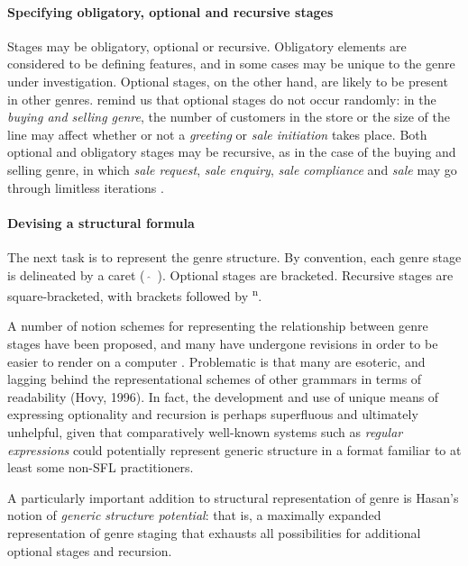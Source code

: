 \paragraph{Specifying obligatory, optional and recursive stages}

Stages may be obligatory, optional or recursive. Obligatory elements are considered to be defining features, and in some cases may be unique to the genre under investigation. Optional stages, on the other hand, are likely to be present in other genres. \textcite{halliday_language_1989} remind us that optional stages do not occur randomly: in the \emph{buying and selling genre}, the number of customers in the store or the size of the line may affect whether or not a \emph{greeting} or \emph{sale initiation} takes place. Both optional and obligatory stages may be recursive, as in the case of the buying and selling genre, in which \emph{sale request}, \emph{sale enquiry}, \emph{sale compliance} and \emph{sale} may go through limitless iterations \cite[p.~61]{halliday_language_1989}.

\paragraph{Devising a structural formula}

The next task is to represent the genre structure. By convention, each genre stage is delineated by a caret (~$\hat{}$~). Optional stages are bracketed. Recursive stages are square-bracketed, with brackets followed by  \textsuperscript{n}.

A number of notion schemes for representing the relationship between genre stages have been proposed, and many have undergone revisions in order to be easier to render on a computer \cite{eggins_introduction_2004}. Problematic is that many \cite[e.g. those in][]{halliday_language_1989} are esoteric, and lagging behind the representational schemes of other grammars in terms of readability (Hovy, 1996). In fact, the development and use of unique means of expressing optionality and recursion is perhaps superfluous and ultimately unhelpful, given that comparatively well\hyp{}known systems such as \emph{regular expressions} could potentially represent generic structure in a format familiar to at least some non\hyp{}\gls{SFL} practitioners. 

A particularly important addition to structural representation of genre is Hasan's \citeyear{hasan_structure_1985} notion of \emph{generic structure potential}: that is, a maximally expanded representation of genre staging that exhausts all possibilities for additional optional stages and recursion.


